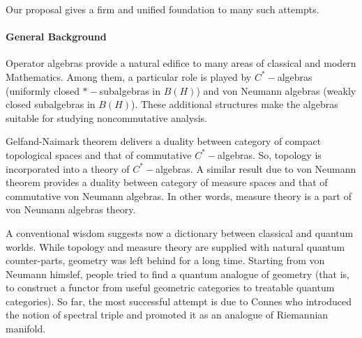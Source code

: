 \documentclass{article}
\begin{document}
%

Our proposal gives a firm and unified foundation to many such attempts.


\paragraph*{General Background}

Operator algebras provide a natural edifice to many areas of classical and modern Mathematics. Among them, a particular role is played by $C^{\ast}-$algebras (uniformly closed $\ast-$subalgebras in $B(H)$) and von Neumann algebras (weakly closed subalgebras in $B(H)$). These additional structures make the algebras suitable for studying noncommutative analysis. 

Gelfand-Naimark theorem delivers a duality between category of compact topological spaces and that of commutative $C^{\ast}-$algebras. So, topology is incorporated into a theory of $C^{\ast}-$algebras. A similar result due to von Neumann theorem provides a duality between category of measure spaces and that of commutative von Neumann algebras. In other words, measure theory is a part of von Neumann algebras theory.

A conventional wisdom suggests now a dictionary between classical and quantum worlds.  While topology and measure theory are supplied with natural quantum counter-parts,  geometry was left behind for a long time. Starting from von Neumann himslef, people tried to find a quantum analogue of geometry (that is, to construct a functor from useful geometric categories to treatable quantum categories). So far, the most successful attempt is due to Connes who introduced the notion of spectral triple and promoted it as an analogue of Riemannian manifold.  
\end{document}
